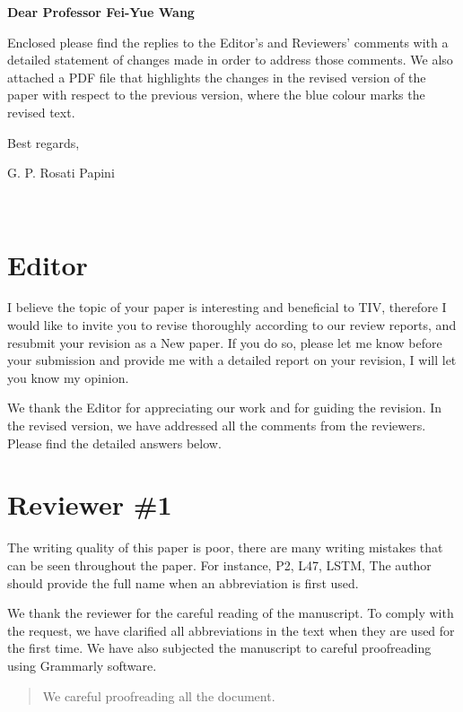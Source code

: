 \documentclass{article}
\def\Editor{Dear Professor Fei-Yue Wang}
\def\Letter{Enclosed please find the replies to the Editor's and Reviewers' comments with a detailed statement of changes made in order to address those comments. We also attached a PDF file that highlights the changes in the revised version of the paper with respect to the previous version, where the blue colour marks the revised text.
	
	Best regards,
	
	G. P. Rosati Papini
}
\providecommand{\Editor}{Name}
\providecommand{\Letter}{Body}
\begin{document}
{\Large\bf \Editor}\\[1em]
{\large\Letter}\\[1em]
\newpage
\headall


\section{Editor}

\RC I believe the topic of your paper is interesting and beneficial to TIV, therefore I would like to invite you to revise thoroughly according to our review reports, and resubmit your revision as a New paper. If you do so, please let me know before your submission and provide me with a detailed report on your revision, I will let you know my opinion.

\AR We thank the Editor for appreciating our work and for guiding the revision. In the revised version, we have addressed all the comments from the reviewers. Please find the detailed answers below.




\newpage
\headall

\section{Reviewer \#1}

\RC The writing quality of this paper is poor, there are many writing mistakes that can be seen throughout the paper. For instance, P2, L47, LSTM, The author should provide the full name when an abbreviation is first used.

\AR We thank the reviewer for the careful reading of the manuscript. To comply with the request, we have clarified all abbreviations in the text when they are used for the first time.
We have also subjected the manuscript to careful proofreading using Grammarly software. 


\begin{quote}
    We careful proofreading all the document.
\end{quote}
\end{document}
